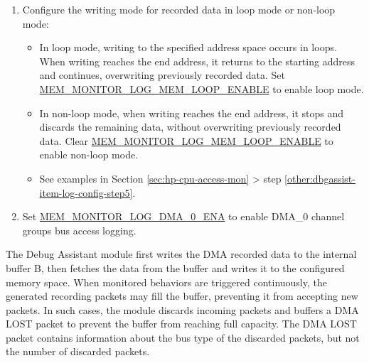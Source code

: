 \documentclass[main\_\_EN.tex]{subfiles}
\begin{document}
\begin{enumerate}
\begin{itemize}
            \item \hyperref[regdesc:MEMMONITORLOGMEMSTARTREG]{MEM\_MONITOR\_LOG\_MEM\_START\_REG} and \hyperref[regdesc:MEMMONITORLOGMEMENDREG]{MEM\_MONITOR\_LOG\_MEM\_END\_REG} specify the storage space for recorded data, which must be in the range of 0x4080\_0000 to 0x4084\_FFFF.
            \item Set \hyperref[regdesc:MEMMONITORLOGMEMADDRUPDATEREG]{MEM\_MONITOR\_LOG\_MEM\_ADDR\_UPDATE\_REG} to update the value in \hyperref[regdesc:MEMMONITORLOGMEMCURRENTADDRREG]{MEM\_MONITOR\_LOG\_MEM\_CURRENT\_ADDR\_REG} to \hyperref[regdesc:MEMMONITORLOGMEMSTARTREG]{MEM\_MONITOR\_LOG\_MEM\_START\_REG}.
            \item Configure the Debug Assistant module's permission to access the HP SRAM. The Debug Assistant module can access the HP SRAM only when access permission is enabled. For more information, refer to Chapter \ref{mod:permctrl} \textit{}.
        \end{itemize}
    \item Configure the writing mode for recorded data in loop mode or non-loop mode:
        \begin{itemize}
            \item In loop mode, writing to the specified address space occurs in loops. When writing reaches the end address, it returns to the starting address and continues, overwriting previously recorded data. Set \hyperref[fielddesc:MEMMONITORLOGMEMLOOPENABLE]{MEM\_MONITOR\_LOG\_MEM\_LOOP\_ENABLE} to enable loop mode.
            \item In non-loop mode, when writing reaches the end address, it stops and discards the remaining data, without overwriting previously recorded data. Clear \hyperref[fielddesc:MEMMONITORLOGMEMLOOPENABLE]{MEM\_MONITOR\_LOG\_MEM\_LOOP\_ENABLE} to enable non-loop mode.
            \item See examples in Section \ref{sec:hp-cpu-access-mon} > step \ref{other:dbgassist-item-log-config-step5}.
        \end{itemize}
    \item Set \hyperref[fielddesc:MEMMONITORLOGDMA0ENA]{MEM\_MONITOR\_LOG\_DMA\_0\_ENA} to enable DMA\_0 channel groups bus access logging.
\end{enumerate}

The Debug Assistant module first writes the DMA recorded data to the internal buffer B, then fetches the data from the buffer and writes it to the configured memory space. When monitored behaviors are triggered continuously, the generated recording packets may fill the buffer, preventing it from accepting new packets. In such cases, the module discards incoming packets and buffers a DMA LOST packet to prevent the buffer from reaching full capacity. The DMA LOST packet contains information about the bus type of the discarded packets, but not the number of discarded packets.
\end{document}
